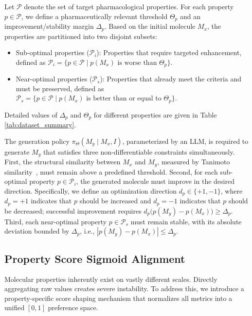 \documentclass[11pt]{article}
\begin{document}
Let $\mathcal{P}$ denote the set of target pharmacological properties. For each property $p \in \mathcal{P}$, we define a pharmaceutically relevant threshold $\Theta_p$ and an improvement/stability margin $\Delta_p$. Based on the initial molecule $M_x$, the properties are partitioned into two disjoint subsets: 
\begin{itemize}
    \item Sub-optimal properties ($\mathcal{P}_i$): Properties that require targeted enhancement, defined as $\mathcal{P}_i = \{p \in \mathcal{P} \mid p(M_x) \mbox{ is worse than } \Theta_p\}$.
    \item Near-optimal properties ($\mathcal{P}_s$): Properties that already meet the criteria and must be preserved, defined as $\mathcal{P}_s = \{p \in \mathcal{P} \mid p(M_x) \mbox{ is better than or equal to } \Theta_p\}$.
\end{itemize}

Detailed values of $\Delta_p$ and $\Theta_p$ for different properties are given in Table \ref{tab:dataset_summary}. 



The generation policy $\pi_\Theta(M_y \mid M_x, I)$, parameterized by an LLM, is required to generate $M_y$ that satisfies three non-differentiable constraints simultaneously. 
First, the structural similarity between $M_x$ and $M_y$, measured by Tanimoto similarity~\cite{bajusz2015tanimoto}, must remain above a predefined threshold. 
Second, for each sub-optimal property $p \in \mathcal{P}_i$, the generated molecule must improve in the desired direction. 
Specifically, we define an optimization direction $d_p \in \{+1,-1\}$, where $d_p=+1$ indicates that $p$ should be increased and $d_p=-1$ indicates that $p$ should be decreased; successful improvement requires
$d_p\bigl(p(M_y)-p(M_x)\bigr) \ge \Delta_p$. 
Third, each near-optimal property $p \in \mathcal{P}_s$ must remain stable, with its absolute deviation bounded by $\Delta_p$, i.e., $|p(M_y)-p(M_x)| \le \Delta_p$.





\subsection{Property Score Sigmoid Alignment}

Molecular properties inherently exist on vastly different scales. Directly aggregating raw values creates severe instability. To address this, we introduce a property-specific score shaping mechanism that normalizes all metrics into a unified $[0, 1]$ preference space. 
\end{document}
